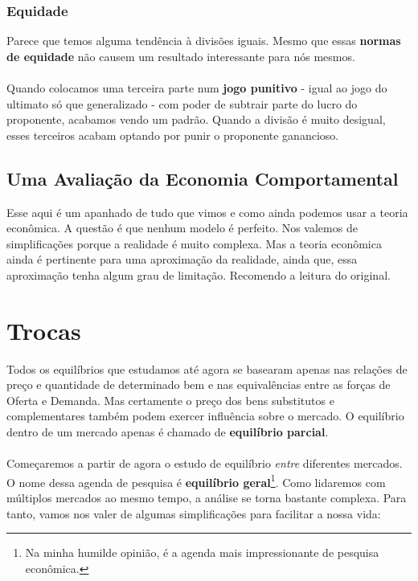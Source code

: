 \documentclass[a4paper,11pt,oneside]{book}
\theoremstyle{definition}
\theoremstyle{break}
\begin{document}
\subsection{Equidade}

Parece que temos alguma tendência à divisões iguais. Mesmo que essas \textbf{normas de equidade} não causem um resultado interessante para nós mesmos.
\\
\\
Quando colocamos uma terceira parte num \textbf{jogo punitivo} - igual ao jogo do ultimato só que generalizado - com poder de subtrair parte do lucro do proponente, acabamos vendo um padrão. Quando a divisão é muito desigual, esses terceiros acabam optando por punir o proponente ganancioso.

\section{Uma Avaliação da Economia Comportamental}

Esse aqui é um apanhado de tudo que vimos e como ainda podemos usar a teoria econômica. A questão é que nenhum modelo é perfeito. Nos valemos de simplificações porque a realidade é muito complexa. Mas a teoria econômica ainda é pertinente para uma aproximação da realidade, ainda que, essa aproximação tenha algum grau de limitação. Recomendo a leitura do original.


\chapter{Trocas}

Todos os equilíbrios que estudamos até agora se basearam apenas nas relações de preço e quantidade de determinado bem e nas equivalências entre as forças de Oferta e Demanda. Mas certamente o preço dos bens substitutos e complementares também podem exercer influência sobre o mercado. O equilíbrio dentro de um mercado apenas é chamado de \textbf{equilíbrio parcial}. 
\\
\\
Começaremos a partir de agora o estudo de equilíbrio \textit{entre} diferentes mercados. O nome dessa agenda de pesquisa é \textbf{equilíbrio geral}\footnote{Na minha humilde opinião, é a agenda mais impressionante de pesquisa econômica.}. Como lidaremos com múltiplos mercados ao mesmo tempo, a análise se torna bastante complexa. Para tanto, vamos nos valer de algumas simplificações para facilitar a nossa vida:
\end{document}
